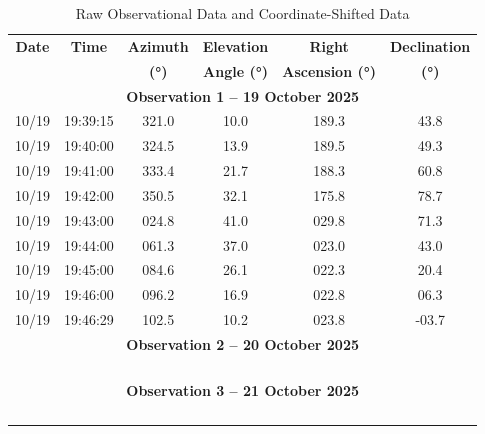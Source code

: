 \documentclass{article}
\begin{document}
\begin{table}[H]
\centering
\caption{Raw Observational Data and Coordinate-Shifted Data}
\renewcommand{\arraystretch}{1.2}
\begin{tabular}{|c|c|c|c|c|c|}
\hline
\textbf{Date} & \textbf{Time} & \textbf{Azimuth} & \textbf{Elevation} & \textbf{Right} & \textbf{Declination} \\ 
\textbf{ } & \textbf{ } & \textbf{(°)} & \textbf{Angle (°)} & \textbf{Ascension (°)} & \textbf{(°)} \\ \hline
\multicolumn{6}{|c|}{\textbf{Observation 1 – 19 October 2025}} \\ \hline
10/19 & 19:39:15 & 321.0 & 10.0 & 189.3 & 43.8 \\ \hline
10/19 & 19:40:00 & 324.5 & 13.9 & 189.5 & 49.3 \\ \hline
10/19 & 19:41:00 & 333.4 & 21.7 & 188.3 & 60.8 \\ \hline
10/19 & 19:42:00 & 350.5 & 32.1 & 175.8 & 78.7 \\ \hline
10/19 & 19:43:00 & 024.8 & 41.0 & 029.8 & 71.3 \\ \hline
10/19 & 19:44:00 & 061.3 & 37.0 & 023.0 & 43.0 \\ \hline
10/19 & 19:45:00 & 084.6 & 26.1 & 022.3 & 20.4 \\ \hline
10/19 & 19:46:00 & 096.2 & 16.9 & 022.8 & 06.3 \\ \hline
10/19 & 19:46:29 & 102.5 & 10.2 & 023.8 & -03.7 \\ \hline
\multicolumn{6}{|c|}{\textbf{Observation 2 – 20 October 2025}} \\ \hline
 &  &  &  &  &  \\ \hline
 &  &  &  &  &  \\ \hline
 &  &  &  &  &  \\ \hline
 &  &  &  &  &  \\ \hline
\multicolumn{6}{|c|}{\textbf{Observation 3 – 21 October 2025}} \\ \hline
 &  &  &  &  &  \\ \hline
 &  &  &  &  &  \\ \hline
 &  &  &  &  &  \\ \hline
 &  &  &  &  &  \\ \hline
\end{tabular}
\end{table}
\end{document}
